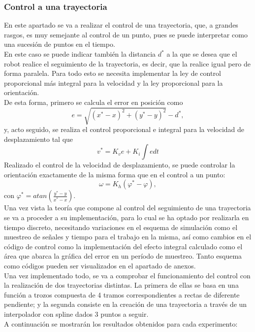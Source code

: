 \documentclass[a4paper,twoside]{article}
\begin{document}
	\subsubsection{Control a una trayectoria}
	En este apartado se va a realizar el control de una trayectoria, que, a grandes rasgos, es muy semejante al control de un punto, pues se puede interpretar como una sucesión de puntos en el tiempo.\\
	En este caso se puede indicar también la distancia $d^*$ a la que se desea que el robot realice el seguimiento de la trayectoria, es decir, que la realice igual pero de forma paralela. Para todo esto se necesita implementar la ley de control proporcional más integral para la velocidad y la ley proporcional para la orientación.\\
	De esta forma, primero se calcula el error en posición como
	\begin{equation}
	e=\sqrt{(x^*-x)^2+(y^*-y)^2}-d^*,
	\end{equation}
	y, acto seguido, se realiza el control proporcional e integral para la velocidad de desplazamiento tal que
	\begin{equation}
	v^*=K_ve+K_i\int{edt}
	\end{equation}
	Realizado el control de la velocidad de desplazamiento, se puede controlar la orientación exactamente de la misma forma que en el control a un punto:
	\begin{equation}
	\omega=K_h(\varphi^*-\varphi),
	\end{equation}
	con $\varphi^*=atan(\frac{y^*-y}{x^*-x})$.\\
	
	Una vez vista la teoría que compone al control del seguimiento de una trayectoria se va a proceder a su implementación, para lo cual se ha optado por realizarla en tiempo discreto, necesitando variaciones en el esquema de simulación como el muestreo de señales y tiempo para el trabajo en la misma, así como cambios en el código de control como la implementación del efecto integral calculado como el área que abarca la gráfica del error en un período de muestreo. Tanto esquema como códigos pueden ser visualizados en el apartado de anexos.\\
	
	Una vez implementado todo, se va a comprobar el funcionamiento del control con la realización de dos trayectorias distintas. La primera de ellas se basa en una función a trozos compuesta de 4 tramos correspondientes a rectas de diferente pendiente; y la segunda consiste en la creación de una trayectoria a través de un interpolador con spline dados 3 puntos a seguir.\\
	A continuación se mostrarán los resultados obtenidos para cada experimento:
	
\end{document}
